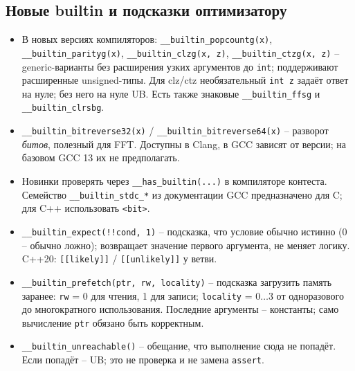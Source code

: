 \subsection{Новые builtin и подсказки оптимизатору}
\begin{itemize}[leftmargin=*, nosep]
\item В новых версиях компиляторов: \verb|__builtin_popcountg(x)|, \verb|__builtin_parityg(x)|, \verb|__builtin_clzg(x, z)|, \verb|__builtin_ctzg(x, z)| -- generic-варианты без расширения узких аргументов до \verb|int|; поддерживают расширенные unsigned-типы. Для clz/ctz необязательный \verb|int z| задаёт ответ на нуле; без него на нуле UB. Есть также знаковые \verb|__builtin_ffsg| и \verb|__builtin_clrsbg|.
\item \verb|__builtin_bitreverse32(x)| / \verb|__builtin_bitreverse64(x)| -- разворот \emph{битов}, полезный для FFT. Доступны в Clang, в GCC зависят от версии; на базовом GCC 13 их не предполагать.
\item Новинки проверять через \verb|__has_builtin(...)| в компиляторе контеста. Семейство \verb|__builtin_stdc_*| из документации GCC предназначено для C; для C++ использовать \verb|<bit>|.
\item \verb|__builtin_expect(!!cond, 1)| -- подсказка, что условие обычно истинно (0 -- обычно ложно); возвращает значение первого аргумента, не меняет логику. C++20: \verb|[[likely]]| / \verb|[[unlikely]]| у ветви.
\item \verb|__builtin_prefetch(ptr, rw, locality)| -- подсказка загрузить память заранее: \verb|rw| = 0 для чтения, 1 для записи; \verb|locality| = $0\ldots3$ от одноразового до многократного использования. Последние аргументы -- константы; само вычисление \verb|ptr| обязано быть корректным.
\item \verb|__builtin_unreachable()| -- обещание, что выполнение сюда не попадёт. Если попадёт -- UB; это не проверка и не замена \verb|assert|.
\end{itemize}
